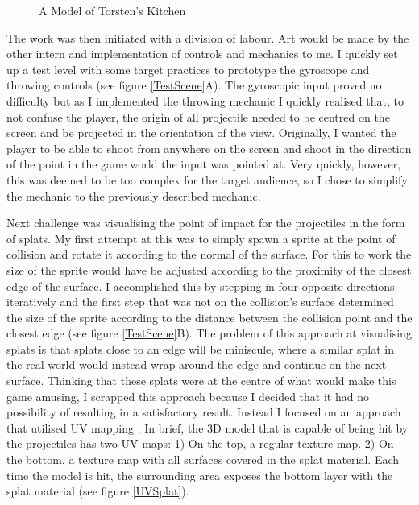 \begin{center}
  \begin{figure}
    \noindent{}
    \caption{A Model of Torsten's Kitchen}
    \label{kitchenmodel}
  \end{figure}
\end{center}

The work was then initiated with a division of labour. Art would be made by the other intern and implementation of controls and mechanics to me. I quickly set up a test level with some target practices to prototype the gyroscope and throwing controls (see figure \ref{TestScene}A). The gyroscopic input proved no difficulty but as I implemented the throwing mechanic I quickly realised that, to not confuse the player, the origin of all projectile needed to be centred on the screen and be projected in the orientation of the view. Originally, I wanted the player to be able to shoot from anywhere on the screen and shoot in the direction of the point in the game world the input was pointed at. Very quickly, however, this was deemed to be too complex for the target audience, so I chose to simplify the mechanic to the previously described mechanic.

Next challenge was visualising the point of impact for the projectiles in the form of splats. My first attempt at this was to simply spawn a sprite at the point of collision and rotate it according to the normal of the surface. For this to work the size of the sprite would have be adjusted according to the proximity of the closest edge of the surface. I accomplished this by stepping in four opposite directions iteratively and the first step that was not on the collision's surface determined the size of the sprite according to the distance between the collision point and the closest edge (see figure \ref{TestScene}B). The problem of this approach at visualising splats is that splats close to an edge will be miniscule, where a similar splat in the real world would instead wrap around the edge and continue on the next surface. Thinking that these splats were at the centre of what would make this game amusing, I scrapped this approach because I decided that it had no possibility of resulting in a satisfactory result. Instead I focused on an approach that utilised UV mapping \cite{mullen}. In brief, the 3D model that is capable of being hit by the projectiles has two UV maps: 1) On the top, a regular texture map. 2) On the bottom, a texture map with all surfaces covered in the splat material. Each time the model is hit, the surrounding area exposes the bottom layer with the splat material (see figure \ref{UVSplat}).

